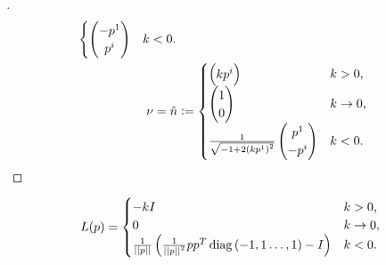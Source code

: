 \documentclass[../main.tex]{subfiles}
\begin{document}
\begin{proof}[]
\begin{align*}
\begin{cases}
\begin{pmatrix}
                  -\tensor{p}{^1} \\
                  \tensor{p}{^i} \\
              \end{pmatrix} & \text{$k<0$.} \\
            \end{cases} \\
            \nu=\hat{n}
            &\defeq
              \begin{cases}
               \begin{pmatrix}
                   k\tensor{p}{^i} \\
               \end{pmatrix} & \text{$k>0$,} \\
               \begin{pmatrix}
                   1 \\
                   0 \\
               \end{pmatrix} & \text{$k\to 0$,} \\
               \frac{1}{\sqrt{-1+2\left(k\tensor{p}{^1}\right)^2}}
               \begin{pmatrix}
                   \tensor{p}{^1} \\
                   -\tensor{p}{^i} \\
               \end{pmatrix} & \text{$k<0$.} \\
             \end{cases} \qedhere
    \end{align*}
\end{proof}
\begin{lemma}\label{M:ShapeOperator}
    \begin{equation*}
        L(p) = \begin{cases}
            -k I & \text{$k>0$,} \\
            0 & \text{$k\to0$,} \\
            \frac{1}{\left|\left|{p}\right|\right|} \left(\frac{1}{\left|\left|{p}\right|\right|^2} p p^T \operatorname{diag}{\left(-1,1\dots,1\right)} - I\right) & \text{$k<0$.} \\
        \end{cases}
    \end{equation*}
\end{lemma}
\end{document}
